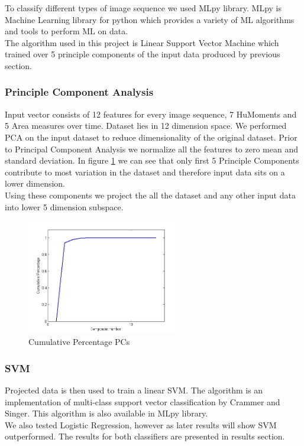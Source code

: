 To classify different types of image sequence we used MLpy library. MLpy is Machine Learning library for python which provides a variety of ML algorithms and tools to perform ML on data.\\
The algorithm used in this project is Linear Support Vector Machine which trained over 5 principle components of the input data produced by previous section.
\subsubsection*{Principle Component Analysis}
Input vector consists of 12 features for every image sequence, 7 HuMoments and 5 Area measures over time. Dataset lies in 12 dimension space. We performed PCA on the input dataset to reduce dimensionality of the original dataset. Prior to Principal Component Analysis we normalize all the features to zero mean and standard deviation. In figure \ref{fig:pcaplot} we can see that only first 5 Principle Components contribute to most variation in the dataset and therefore input data sits on a lower dimension. \\Using these components we project the all the dataset and any other input data into lower 5 dimension subspace.\\

\begin{figure}[htp]
\begin{center}
\leavevmode
\includegraphics[width=0.6\textwidth] {pca.jpg}
\end{center}
\caption{Cumulative Percentage PCs}
\label{fig:pcaplot}
\end{figure}

\subsubsection*{SVM}
Projected data is then used to train a linear SVM. The algorithm is an implementation of multi-class support vector classification by Crammer and Singer. This algorithm is also available in MLpy library.\\
We also tested Logistic Regression, however as later results will show SVM outperformed. The results for both classifiers are presented in results section.
